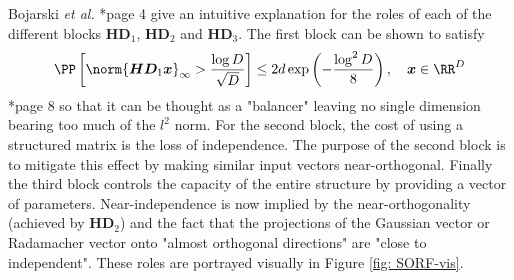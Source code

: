 Bojarski {\it et al.} \cite{BojarskiMariusz2016Saar}*{page 4} give an intuitive explanation for the roles of each of the different blocks $\bm{H} \bm{D}_1$, $\bm{H} \bm{D}_2$ and $\bm{H} \bm{D}_3$. The first block can be shown to satisfy
\[
    \PP \left[ \norm{\bm{H}\bm{D}_1 \bm{x}}_{\infty} > \frac{\log D}{\sqrt{D}} \right] \leq 2 d \exp \left( {-\frac{\log^2 D}{8}} \right), \quad \bm{x} \in \RR^D
\]
\cite{LiuFanghui2021RFfK}*{page 8} so that it can be thought as a "balancer" leaving no single dimension bearing too much of the $l^2$ norm. For the second block, the cost of using a structured matrix is the loss of independence. The purpose of the second block is to mitigate this effect by making similar input vectors near-orthogonal. Finally the third block controls the capacity of the entire structure by providing a vector of parameters. Near-independence is now implied by the near-orthogonality (achieved by $\bm{H} \bm{D}_2$) and the fact that the projections of the Gaussian vector or Radamacher vector onto "almost orthogonal directions" are "close to independent". These roles are portrayed visually in Figure \ref{fig: SORF-vis}.
